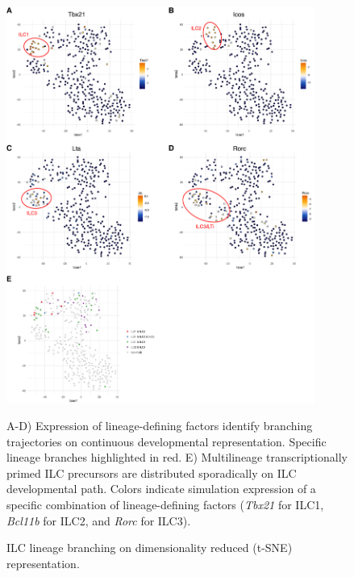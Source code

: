 \begin{subappendices}
\begin{figure}[p]
	\includegraphics[width=0.9\textwidth]{figures/appendix/Appendix_3_branching_multi}
	\caption{ILC lineage branching on dimensionality reduced (t-SNE) representation.} 
	A-D) Expression of lineage-defining factors identify branching trajectories on continuous developmental representation. Specific lineage branches highlighted in red. E) Multilineage transcriptionally primed ILC precursors are distributed sporadically on ILC developmental path. Colors indicate simulation expression of a specific combination of lineage-defining factors (\textit{Tbx21} for ILC1, \textit{Bcl11b} for ILC2, and \textit{Rorc} for ILC3). 
	\label{fig:app_branch}
\end{figure}



\end{subappendices}
